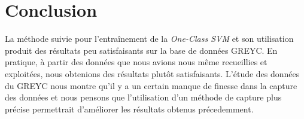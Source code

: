 \section{Conclusion}

La méthode suivie pour l'entraînement de la \textit{One-Class SVM} et son utilisation produit des résultats peu satisfaisants sur la base de données GREYC. En pratique, à partir des données que nous avions nous même recueillies et exploitées, nous obtenions des résultats plutôt satisfaisants. L'étude des données du GREYC nous montre qu'il y a un certain manque de finesse dans la capture des données et nous pensons que l'utilisation d'un méthode de capture plus précise permettrait d'améliorer les résultats obtenus précedemment.